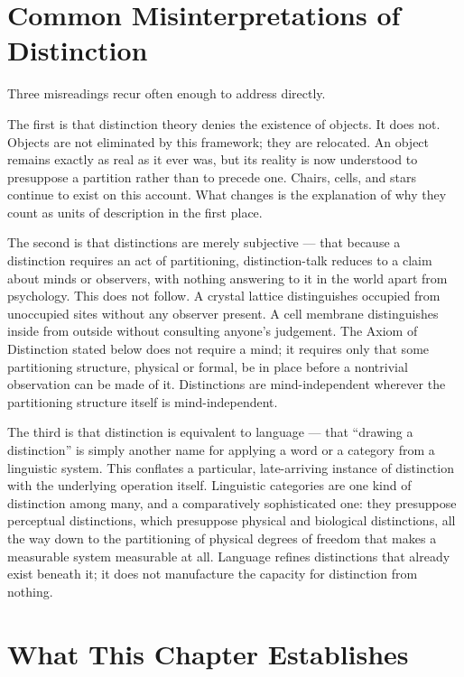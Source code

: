\documentclass[12pt,twoside,openright]{book}
\begin{document}
\section{Common Misinterpretations of Distinction}
\label{sec:ch1-misinterpretations}

Three misreadings recur often enough to address directly.

The first is that distinction theory denies the existence of
objects. It does not. Objects are not eliminated by this
framework; they are relocated. An object remains exactly as
real as it ever was, but its reality is now understood to
presuppose a partition rather than to precede one. Chairs,
cells, and stars continue to exist on this account. What
changes is the explanation of why they count as units of
description in the first place.

The second is that distinctions are merely subjective ---
that because a distinction requires an act of partitioning,
distinction-talk reduces to a claim about minds or observers,
with nothing answering to it in the world apart from
psychology. This does not follow. A crystal lattice
distinguishes occupied from unoccupied sites without any
observer present. A cell membrane distinguishes inside from
outside without consulting anyone's judgement. The Axiom of
Distinction stated below does not require a mind; it requires
only that some partitioning structure, physical or formal, be
in place before a nontrivial observation can be made of it.
Distinctions are mind-independent wherever the partitioning
structure itself is mind-independent.

The third is that distinction is equivalent to language ---
that ``drawing a distinction'' is simply another name for
applying a word or a category from a linguistic system. This
conflates a particular, late-arriving instance of distinction
with the underlying operation itself. Linguistic categories
are one kind of distinction among many, and a comparatively
sophisticated one: they presuppose perceptual distinctions,
which presuppose physical and biological distinctions, all the
way down to the partitioning of physical degrees of freedom
that makes a measurable system measurable at all. Language
refines distinctions that already exist beneath it; it does
not manufacture the capacity for distinction from nothing.

\section{What This Chapter Establishes}
\label{sec:ch1-preview}
\end{document}
